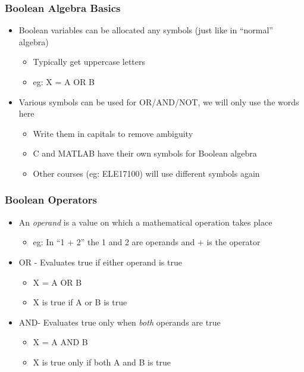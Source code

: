 \documentclass[14pt]{beamer}
\begin{document}
\begin{frame} %
\frametitle{Boolean Algebra Basics}
\begin{itemize}
\item Boolean variables can be allocated any symbols (just like in ``normal'' algebra)
	\begin{itemize}
		\item Typically get uppercase letters
		\item eg: X = A OR B
	\end{itemize}
\item Various symbols can be used for OR/AND/NOT, we will only use the words here
	\begin{itemize}
		\item Write them in capitals to remove ambiguity
		\item C and MATLAB have their own symbols for Boolean algebra
		\item Other courses (eg: ELE17100) will use different symbols again
	\end{itemize}
\end{itemize}
\end{frame}

\begin{frame} %
\frametitle{Boolean Operators}
\begin{itemize}
\item An \textit{operand} is a value on which a mathematical operation takes place
	\begin{itemize}
		\item eg: In ``1 + 2'' the 1 and 2 are operands and + is the operator
	\end{itemize}
\item OR - Evaluates true if either operand is true
	\begin{itemize}
		\item X = A OR B
		\item X is true if A or B is true
	\end{itemize}
\item AND- Evaluates true only when \textit{both} operands are true
	\begin{itemize}
		\item X = A AND B
		\item X is true only if both A and B is true
	\end{itemize}
\end{itemize}
\end{frame}
\end{document}

